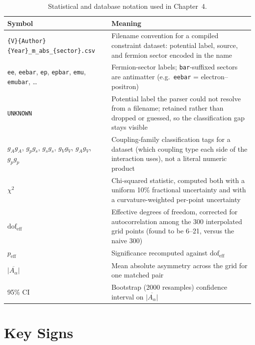 \documentclass[main]{subfiles}
\begin{document}
\begin{table}[h]
\centering
\begin{tabular}{@{}l>{\raggedright\arraybackslash}p{9.5cm}@{}}
\toprule
Symbol & Meaning \\
\midrule
\texttt{\{V\}\{Author\}\{Year\}\_m\_abs\_\{sector\}.csv} & Filename convention for a compiled constraint dataset: potential label, source, and fermion sector encoded in the name \\
\texttt{ee}, \texttt{eebar}, \texttt{ep}, \texttt{epbar}, \texttt{emu}, \texttt{emubar}, \ldots & Fermion-sector labels; \texttt{bar}-suffixed sectors are antimatter (e.g.\ \texttt{eebar} = electron--positron) \\
\texttt{UNKNOWN} & Potential label the parser could not resolve from a filename; retained rather than dropped or guessed, so the classification gap stays visible \\
$g_Ag_A$, $g_pg_s$, $g_sg_s$, $g_Vg_V$, $g_Ag_V$, $g_pg_p$ & Coupling-family classification tags for a dataset (which coupling type each side of the interaction uses), not a literal numeric product \\
$\chi^2$ & Chi-squared statistic, computed both with a uniform 10\% fractional uncertainty and with a curvature-weighted per-point uncertainty \\
$\mathrm{dof}_{\text{eff}}$ & Effective degrees of freedom, corrected for autocorrelation among the 300 interpolated grid points (found to be 6--21, versus the naive 300) \\
$p_{\text{eff}}$ & Significance recomputed against $\mathrm{dof}_{\text{eff}}$ \\
$\overline{|A_\alpha|}$ & Mean absolute asymmetry across the grid for one matched pair \\
95\% CI & Bootstrap (2000 resamples) confidence interval on $\overline{|A_\alpha|}$ \\
\bottomrule
\end{tabular}
\caption{Statistical and database notation used in Chapter~4.}
\label{tab:app-stats}
\end{table}

\section{Key Signs}
\end{document}
